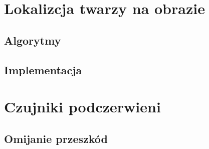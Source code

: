 \section{Lokalizcja twarzy na obrazie}
\subsection{Algorytmy}
\subsection{Implementacja}
\section{Czujniki podczerwieni}
\subsection{Omijanie przeszkód}